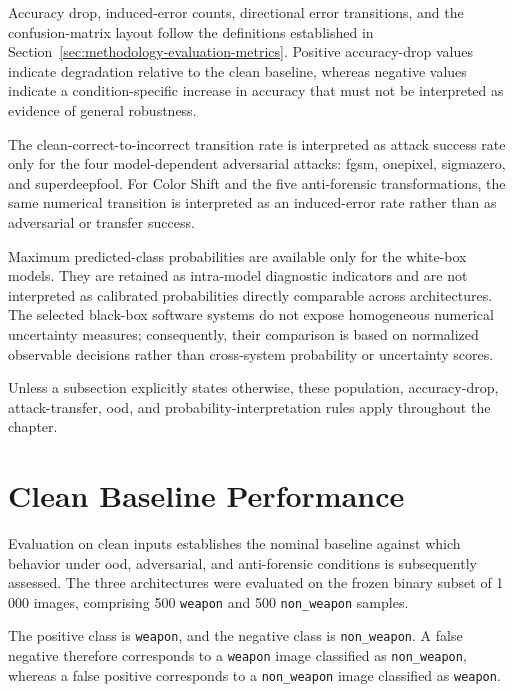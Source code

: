 Accuracy drop, induced-error counts, directional error transitions, and the
confusion-matrix layout follow the definitions established in
Section~\ref{sec:methodology-evaluation-metrics}. Positive accuracy-drop values
indicate degradation relative to the clean baseline, whereas negative values
indicate a condition-specific increase in accuracy that must not be interpreted
as evidence of general robustness.

The clean-correct-to-incorrect transition rate is interpreted as attack success
rate only for the four model-dependent adversarial attacks: \gls{fgsm},
\gls{onepixel}, \gls{sigmazero}, and \gls{superdeepfool}. For Color Shift and the five
anti-forensic transformations, the same numerical transition is interpreted as
an induced-error rate rather than as adversarial or transfer success.

Maximum predicted-class probabilities are available only for the white-box
models. They are retained as intra-model diagnostic indicators and are
not interpreted as calibrated probabilities directly comparable across
architectures. The selected black-box software systems do not expose
homogeneous numerical uncertainty measures; consequently, their comparison is
based on normalized observable decisions rather than cross-system probability or uncertainty
scores.

Unless a subsection explicitly states otherwise, these population,
accuracy-drop, attack-transfer, \gls{ood}, and probability-interpretation rules
apply throughout the chapter.

\section{Clean Baseline Performance}
\label{sec:results-clean-baseline}

Evaluation on clean inputs establishes the nominal baseline against which
behavior under \gls{ood}, adversarial, and anti-forensic conditions is
subsequently assessed. The three architectures were evaluated on the
frozen binary subset of 1\,000 images, comprising 500
\texttt{weapon} and 500 \texttt{non\_weapon} samples.

The positive class is \texttt{weapon}, and the negative class is
\texttt{non\_weapon}. A false negative therefore corresponds to a
\texttt{weapon} image classified as \texttt{non\_weapon}, whereas a false
positive corresponds to a \texttt{non\_weapon} image classified as
\texttt{weapon}.

